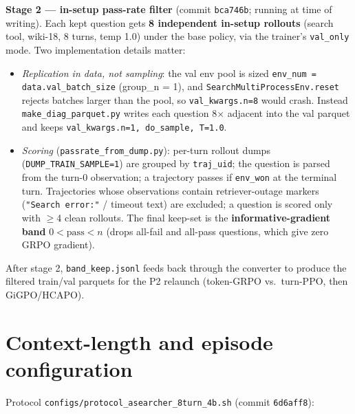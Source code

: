 \documentclass[10pt]{article}
\newcommand{\cmd}[1]{\texttt{\small #1}}
\begin{document}
\textbf{Stage 2 --- in-setup pass-rate filter} (commit \cmd{bca746b}; running at time of writing).
Each kept question gets \textbf{8 independent in-setup rollouts} (search tool, wiki-18, 8 turns,
temp 1.0) under the base policy, via the trainer's \cmd{val\_only} mode. Two implementation details
matter:
\begin{itemize}
\item \emph{Replication in data, not sampling}: the val env pool is sized \cmd{env\_num =
data.val\_batch\_size} (group\_n = 1), and \cmd{SearchMultiProcessEnv.reset} rejects batches larger than
the pool, so \cmd{val\_kwargs.n{=}8} would crash. Instead \cmd{make\_diag\_parquet.py} writes each
question 8$\times$ adjacent into the val parquet and keeps \cmd{val\_kwargs.n{=}1, do\_sample, T{=}1.0}.
\item \emph{Scoring} (\cmd{passrate\_from\_dump.py}): per-turn rollout dumps
(\cmd{DUMP\_TRAIN\_SAMPLE=1}) are grouped by \cmd{traj\_uid}; the question is parsed from the turn-0
observation; a trajectory passes if \cmd{env\_won} at the terminal turn. Trajectories whose observations
contain retriever-outage markers (\cmd{"Search error:"} / timeout text) are excluded; a question is
scored only with $\geq$4 clean rollouts. The final keep-set is the \textbf{informative-gradient band}
$0 < \mathrm{pass} < n$ (drops all-fail and all-pass questions, which give zero GRPO gradient).
\end{itemize}
After stage 2, \cmd{band\_keep.jsonl} feeds back through the converter to produce the filtered
train/val parquets for the P2 relaunch (token-GRPO vs.\ turn-PPO, then GiGPO/HCAPO).

\section{Context-length and episode configuration}
Protocol \cmd{configs/protocol\_asearcher\_8turn\_4b.sh} (commit \cmd{6d6aff8}):
\end{document}
